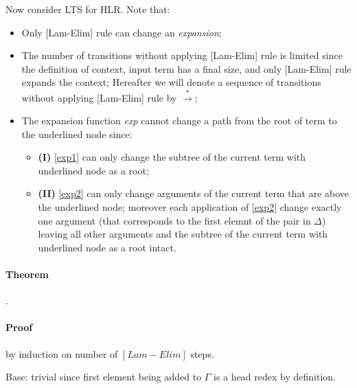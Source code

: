 \documentclass[a4paper, 10pt]{article}
\begin{document}
Now consider LTS for HLR. Note that:
\begin{itemize}
\item Only [Lam-Elim] rule can change an \emph{expansion};
\item The number of transitions without applying [Lam-Elim] rule is limited since the definition of context, input term has a final size, and only [Lam-Elim] rule expands the context; Hereafter we will denote a sequence of transitions without applying [Lam-Elim] rule by $\overset{*}{\rightarrow}$;
\item The expansion function \emph{exp} cannot change a path from the root of term to the underlined node since:
  \begin{itemize}
  \item \textbf{(I)} \eqref{exp1} can only change the subtree of the current term with underlined node as a root;
  \item \textbf{(II)} \eqref{exp2} can only change arguments of the current term that are above the underlined node; moreover each application of \eqref{exp2} change exactly one argument (that corresponds to the first elemnt of the pair in $\Delta$) leaving all other arguments and the subtree of the current term with underlined node as a root intact.
  \end{itemize}
\end{itemize}


\paragraph{Theorem}.


\paragraph{Proof} by induction on number of $[Lam-Elim]$ steps.

Base: trivial since first element being added to $\Gamma$ is a head redex by definition.
\end{document}
